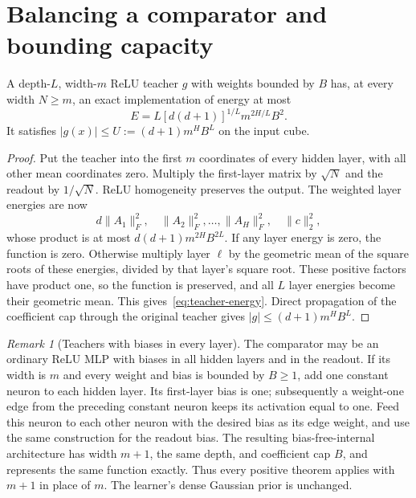 \documentclass[11pt]{article}
\theoremstyle{remark}\newtheorem{remark}[theorem]{Remark}
\begin{document}
\section{Balancing a comparator and bounding capacity}
\begin{lemma}
\label{lem:teacher}
A depth-$L$, width-$m$ ReLU teacher $g$ with weights bounded by $B$ has, at every width $N\ge m$, an exact implementation of energy at most
\begin{equation}
 E=L[d(d+1)]^{1/L}m^{2H/L}B^2.
 \label{eq:teacher-energy}
\end{equation}
It satisfies $|g(x)|\le U:=(d+1)m^H B^L$ on the input cube.
\end{lemma}
\begin{proof}
Put the teacher into the first $m$ coordinates of every hidden layer, with all other mean coordinates zero. Multiply the first-layer matrix by $\sqrt N$ and the readout by $1/\sqrt N$. ReLU homogeneity preserves the output. The weighted layer energies are now
\[
 d\|A_1\|_F^2,\quad \|A_2\|_F^2,\ldots,\|A_H\|_F^2,
 \quad\|c\|_2^2,
\]
whose product is at most $d(d+1)m^{2H}B^{2L}$.
If any layer energy is zero, the function is zero. Otherwise multiply layer $\ell$ by the geometric mean of the square roots of these energies, divided by that layer's square root. These positive factors have product one, so the function is preserved, and all $L$ layer energies become their geometric mean. This gives~\eqref{eq:teacher-energy}. Direct propagation of the coefficient cap through the original teacher gives $|g|\le(d+1)m^HB^L$.
\end{proof}

\begin{remark}[Teachers with biases in every layer]
The comparator may be an ordinary ReLU MLP with biases in all hidden layers and in the readout. If its width is $m$ and every weight and bias is bounded by $B\ge1$, add one constant neuron to each hidden layer. Its first-layer bias is one; subsequently a weight-one edge from the preceding constant neuron keeps its activation equal to one. Feed this neuron to each other neuron with the desired bias as its edge weight, and use the same construction for the readout bias. The resulting bias-free-internal architecture has width $m+1$, the same depth, and coefficient cap $B$, and represents the same function exactly. Thus every positive theorem applies with $m+1$ in place of $m$. The learner's dense Gaussian prior is unchanged.
\end{remark}
\end{document}
